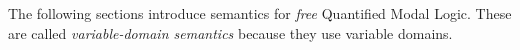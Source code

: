 \documentclass[../../../include/open-logic-section]{subfiles}
\begin{document}


The following sections introduce semantics for \emph{free}
Quantified Modal Logic. These are called \emph{variable-domain semantics}
because they use variable domains.
\end{document}
